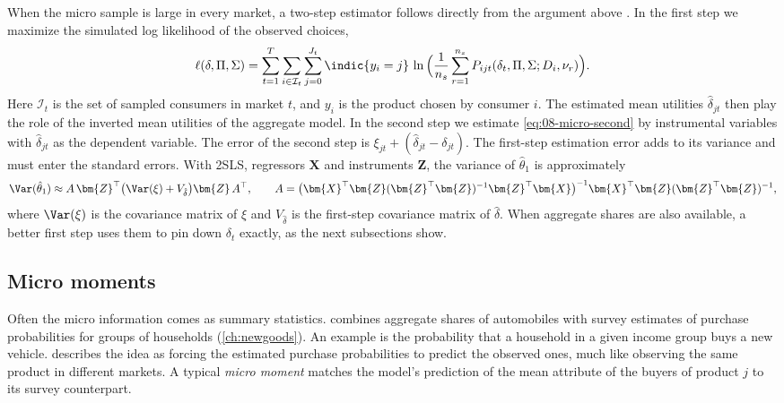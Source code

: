 When the micro sample is large in every market, a two-step estimator follows directly from the argument above
\citep[p.~544]{Nevo2000a}. In the first step we maximize the simulated log likelihood of the observed choices,
\begin{equation}\label{eq:08-micro-lik}
  \ell(\delta, \Pi, \Sigma) = \sum_{t=1}^{T}\sum_{i \in \mathcal{I}_t}\sum_{j=0}^{J_t}\indic\{y_i = j\}\,
  \ln\Big(\frac{1}{n_s}\sum_{r=1}^{n_s}P_{ijt}(\delta_t, \Pi, \Sigma; D_i, \nu_r)\Big).
\end{equation}
Here $\mathcal{I}_t$ is the set of sampled consumers in market $t$, and $y_i$ is the product chosen by consumer $i$.
The estimated mean utilities $\hat\delta_{jt}$ then play the role of the inverted mean utilities of the aggregate model. In
the second step we estimate \eqref{eq:08-micro-second} by instrumental variables with $\hat\delta_{jt}$ as the dependent
variable. The error of the second step is $\xi_{jt} + (\hat\delta_{jt} - \delta_{jt})$. The first-step estimation
error adds to its variance and must enter the standard errors. With 2SLS, regressors $\bm{X}$ and instruments
$\bm{Z}$, the variance of $\hat\theta_1$ is approximately
\begin{equation}\label{eq:08-micro-var}
  \Var(\hat\theta_1) \approx A\, \bm{Z}^\top\big(\Var(\xi) + V_{\hat\delta}\big)\bm{Z}\, A^\top, \qquad
  A = \big(\bm{X}^\top \bm{Z}(\bm{Z}^\top \bm{Z})^{-1}\bm{Z}^\top \bm{X}\big)^{-1}\bm{X}^\top \bm{Z}(\bm{Z}^\top \bm{Z})^{-1},
\end{equation}
where $\Var(\xi)$ is the covariance matrix of $\xi$ and $V_{\hat\delta}$ is the first-step covariance matrix of
$\hat\delta$. When aggregate shares are also available, a better first step uses them to pin down $\delta_t$ exactly,
as the next subsections show.

\subsection{Micro moments}\label{sec:08-micro-moments}

Often the micro information comes as summary statistics. \citet{Petrin2002} combines aggregate shares of
automobiles with survey estimates of purchase probabilities for groups of households (\cref{ch:newgoods}). An example
is the probability that a household in a given income group buys a new vehicle. \citet[Section~5.2]{Nevo2000a} describes the
idea as forcing the estimated purchase probabilities to predict the observed ones, much like observing the same
product in different markets. A typical \emph{micro moment} matches the model's prediction of the mean attribute of
the buyers of product $j$ to its survey counterpart.

